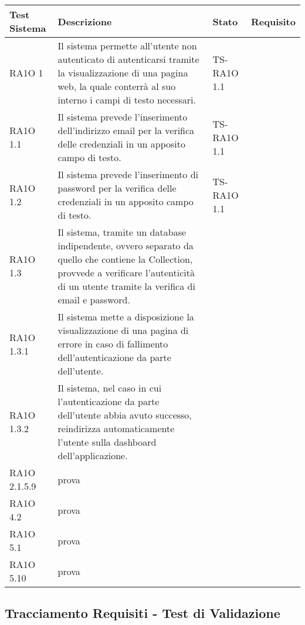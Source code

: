  \begin{center}
  \def\arraystretch{1.5}
  \bgroup
    \begin{longtable}{| p{3cm} | p{6cm} | p{1.5cm} | p{2cm} | }
    \hline 
     \textbf{Test Sistema} & \textbf{Descrizione} & \textbf{Stato} & \textbf{Requisito} \\ \hline
        RA1O 1 & 
        Il sistema permette all'utente non autenticato di autenticarsi tramite la visualizzazione di una pagina web, la quale conterrà al suo interno i campi di testo necessari.  & TS-RA1O 1.1  \\ \hline 
        RA1O 1.1 & 
        Il sistema prevede l'inserimento dell'indirizzo email per la verifica delle credenziali in un apposito campo di testo. & TS-RA1O 1.1  \\ \hline 
        RA1O 1.2 & 
        Il sistema prevede l'inserimento di password per la verifica delle credenziali in un apposito campo di testo. & TS-RA1O 1.1  \\ \hline 
        RA1O 1.3 & 
        Il sistema, tramite un database indipendente, ovvero separato da quello che contiene la Collection, provvede a verificare l'autenticità  di un utente tramite la verifica di email e password. &  \\ \hline 
        RA1O 1.3.1 & 
        Il sistema mette a disposizione la visualizzazione di una pagina di errore in caso di fallimento dell'autenticazione da parte dell'utente. &  \\ \hline 
        RA1O 1.3.2 & 
        Il sistema, nel caso in cui l'autenticazione da parte dell'utente abbia avuto successo, reindirizza automaticamente l'utente sulla dashboard dell'applicazione. &  \\ \hline 
        RA1O 2.1.5.9 & 
        prova &  \\ \hline 
        RA1O 4.2 & 
        prova &  \\ \hline 
        RA1O 5.1 & 
        prova &  \\ \hline 
        RA1O 5.10 & 
        prova &  \\ \hline 
    \end{longtable}
   \egroup
\end{center}
\clearpage
\subsection{Tracciamento Requisiti - Test di Validazione}

